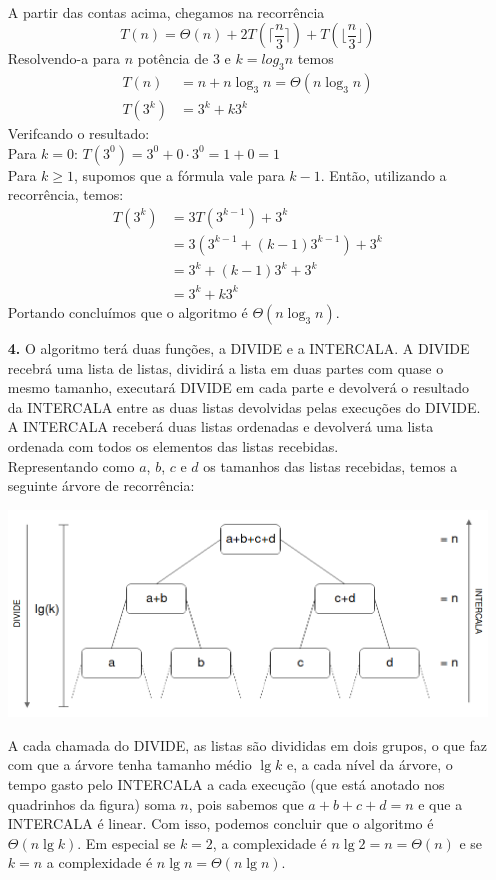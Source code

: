 \documentclass[12pt, a4paper]{article} %
\begin{document}
\begin{enumerate}
\\
A partir das contas acima, chegamos na recorrência
$$T(n) = \Theta(n) + 2T(\Big\lceil \frac{n}{3} \Big\rceil) + T(\Big\lfloor \frac{n}{3} \Big\rfloor)$$
Resolvendo-a para $n$ potência de $3$ e $k = log_3 n$ temos
\begin{align*}
T(n)   &= n + n\log_3 n = \Theta(n\log_3 n)\\
T(3^k) &= 3^k + k3^k
\end{align*}
Verifcando o resultado:\\
Para $k = 0$: $T(3^0) = 3^0 + 0\cdot 3^0 = 1 + 0 = 1$\\
Para $k \geqslant 1$, supomos que a fórmula vale para $k - 1$. Então, utilizando
a recorrência, temos:
\begin{align*}
T(3^k) &= 3T(3^{k-1}) + 3^k\\
       &= 3(3^{k-1} + (k-1)3^{k-1}) + 3^k\\
       &= 3^k + (k-1)3^k + 3^k\\
       &= 3^k + k3^k
\end{align*}
Portando concluímos que o algoritmo é $\Theta(n\log_3 n)$.

\item[\textbf{4.}]
O algoritmo terá duas funções, a DIVIDE e a INTERCALA. A DIVIDE recebrá
uma lista de listas, dividirá a lista em duas partes com quase o mesmo tamanho,
executará DIVIDE em cada parte e devolverá o resultado da INTERCALA entre as
duas listas devolvidas pelas execuções do DIVIDE. A INTERCALA receberá duas
listas ordenadas e devolverá uma lista ordenada com todos os elementos das
listas recebidas.\\
Representando como $a$, $b$, $c$ e $d$ os tamanhos das listas recebidas, temos a
seguinte árvore de recorrência:
\begin{center}
\includegraphics[scale=0.4]{rectree.png}
\end{center}
A cada chamada do DIVIDE, as listas são divididas em dois grupos, o que faz com
que a árvore tenha tamanho médio $\lg k$ e, a cada nível da árvore, o tempo
gasto pelo INTERCALA a cada execução (que está anotado nos quadrinhos da figura)
soma $n$, pois sabemos que $a+b+c+d = n$ e que a INTERCALA é linear. Com isso,
podemos concluir que o algoritmo é $\Theta(n\lg k)$. Em especial se $k = 2$,
a complexidade é $n\lg 2 = n = \Theta(n)$ e se $k = n$ a complexidade é
$n\lg n = \Theta(n\lg n)$.
\end{enumerate}
\end{document}
